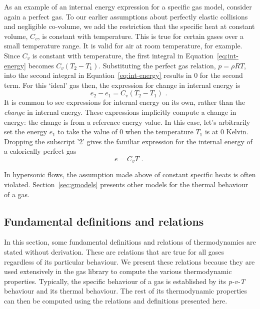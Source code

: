 As an example of an internal energy expression for a specific gas model,
consider again a perfect gas.
To our earlier assumptions about perfectly elastic collisions and
negligible co-volume, we add the restriction that the specific
heat at constant volume, $C_v$, is constant with temperature.
This is true for certain gases over a small temperature range.
It is valid for air at room temperature, for example.
Since $C_v$ is constant with temperature, the first integral
in Equation~\ref{eq:int-energy} becomes $C_v (T_2 - T_1)$.
Substituting the perfect gas relation, $p = \rho R T$,
into the second integral in Equation~\ref{eq:int-energy}
results in 0 for the second term.
For this `ideal' gas then, the expression for change in
internal energy is
\begin{equation}
  e_2 - e_1 = C_v (T_2 - T_1) \text{ . }
\end{equation}
It is common to see expressions for internal energy on its own, rather than
the \emph{change} in internal energy.
These expressions implicitly compute a change in energy: the change is
from a reference energy value.
In this case, let's arbitrarily set the energy $e_1$ to take
the value of 0 when the temperature $T_1$ is at 0 Kelvin.
Dropping the subscript '2' gives the familiar expression
for the internal energy of a calorically perfect gas
\begin{equation}
  e = C_v T \text{ . }
\end{equation}

In hypersonic flows, the assumption made above of constant specific heats is often violated.
Section~\ref{sec:gmodels} presents other models for the thermal behaviour
of a gas.

\subsection{Fundamental definitions and relations}
In this section, some fundamental definitions and relations of
thermodynamics are stated without derivation.
These are relations that are true for all gases regardless
of its particular behaviour.
We present these relations because they are used extensively
in the gas library to compute the various thermodynamic
properties.
Typically, the specific behaviour of a gas is established
by its \textit{p-v-T} behaviour and its thermal
behaviour.
The rest of its thermodynamic properties can then be computed
using the relations and definitions presented here.

